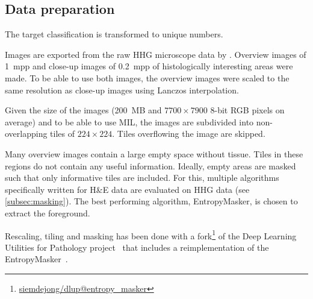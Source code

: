 \subsection{Data preparation}

The target classification is transformed to unique numbers.

Images are exported from the raw HHG microscope data by \textcite{Spies2023}.
Overview images of \qty{1}{mpp} and close-up images of \qty{0.2}{mpp} of histologically interesting areas were made.
To be able to use both images, the overview images were scaled to the same resolution as close-up images using Lanczos interpolation.

Given the size of the images (\qty{200}{MB} and $7700\times7900$ 8-bit RGB pixels on average) and to be able to use MIL, the images are subdivided into non-overlapping tiles of $224 \times 224$.
Tiles overflowing the image are skipped.

Many overview images contain a large empty space without tissue.
Tiles in these regions do not contain any useful information.
Ideally, empty areas are masked such that only informative tiles are included.
For this, multiple algorithms specifically written for H\&E data are evaluated on HHG data (see \cref{subsec:masking}).
The best performing algorithm, EntropyMasker, is chosen to extract the foreground.

Rescaling, tiling and masking has been done with a fork\footnote{\href{https://github.com/siemdejong/dlup/tree/entropy_masker}{ siemdejong/dlup@entropy\_masker}} of the Deep Learning Utilities for Pathology project~\cite{Teuwen2023} that includes a reimplementation of the EntropyMasker~\cite{Laan2022}.
